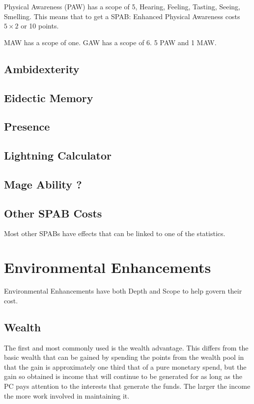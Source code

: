 Physical Awareness (PAW) has a scope of 5, Hearing, Feeling, Tasting,
Seeing, Smelling. This means that to get a SPAB: Enhanced Physical
Awareness costs \( 5 \times 2 \) or 10 points.

MAW has a scope of one.
GAW has a scope of 6. 5 PAW and 1 MAW.

\subsection{Ambidexterity}
\subsection{Eidectic Memory}
\subsection{Presence}
\subsection{Lightning Calculator}
\subsection{Mage Ability ?}
\subsection{Other SPAB Costs}

Most other SPABs have effects that can be linked to one of the
statistics.

\section{Environmental Enhancements}

Environmental Enhancements have both Depth and Scope to help govern
their cost.

\subsection{Wealth}

The first and most commonly used is the wealth advantage. This differs
from the basic wealth that can be gained by spending the points from the
wealth pool in that the gain is approximately one third that of a pure
monetary spend, but the gain so obtained is income that will continue to
be generated for as long as the PC pays attention to the interests that
generate the funds. The larger the income the more work involved in
maintaining it.

